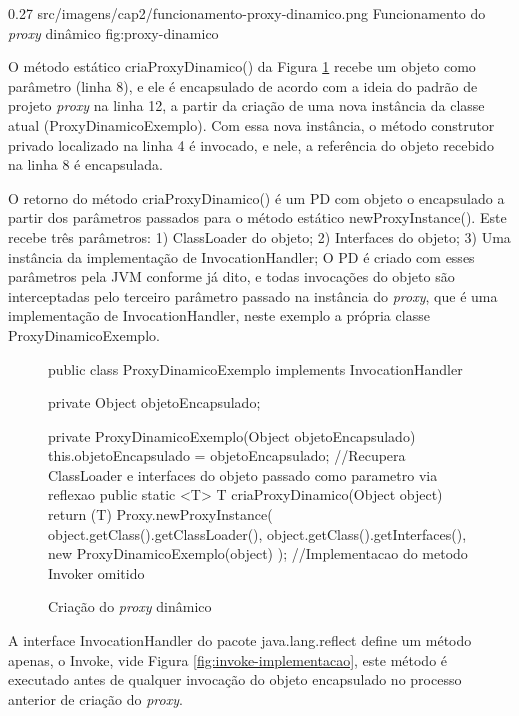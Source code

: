 \begin{image}
{0.27} %
{src/imagens/cap2/funcionamento-proxy-dinamico.png} %
{Funcionamento do \textit{proxy} dinâmico} %
{fig:proxy-dinamico} %
{} %
\end{image}

\par O método estático criaProxyDinamico() da Figura \ref{fig:cria-proxy-dinamico} recebe um objeto como parâmetro (linha 8), e ele é encapsulado de acordo com a ideia do padrão de projeto \textit{proxy} na linha 12, a partir da criação de uma nova instância da classe atual (ProxyDinamicoExemplo). Com essa nova instância, o método construtor privado localizado na linha 4 é invocado, e nele, a referência do objeto recebido na linha 8 é encapsulada.

\par O retorno do método criaProxyDinamico() é um PD com objeto o encapsulado a partir dos parâmetros passados para o método estático newProxyInstance(). Este recebe três parâmetros: 1) ClassLoader do objeto; 2) Interfaces do objeto; 3) Uma instância da implementação de InvocationHandler; O PD é criado com esses parâmetros pela JVM conforme já dito, e todas invocações do objeto são interceptadas pelo terceiro parâmetro passado na instância do \textit{proxy}, que é uma implementação de InvocationHandler, neste exemplo a própria classe ProxyDinamicoExemplo.

\begin{figure}[H]
    \centering
    \caption{Criação do \textit{proxy} dinâmico}
    \label{fig:cria-proxy-dinamico}
    \begin{java}
public class ProxyDinamicoExemplo implements InvocationHandler {
    	private Object objetoEncapsulado;

	private ProxyDinamicoExemplo(Object objetoEncapsulado) {
		this.objetoEncapsulado = objetoEncapsulado;
	}
//Recupera ClassLoader e interfaces do objeto passado como parametro via reflexao
	public static <T> T criaProxyDinamico(Object object) {
		return (T) Proxy.newProxyInstance(
        		object.getClass().getClassLoader(),
        		object.getClass().getInterfaces(),
        		new ProxyDinamicoExemplo(object)
		);
	}
//Implementacao do metodo Invoker omitido
}
    \end{java}
\end{figure}


\par A interface InvocationHandler do pacote java.lang.reflect define um método apenas, o Invoke, vide Figura \ref{fig:invoke-implementacao}, este método é executado antes de qualquer invocação do objeto encapsulado no processo anterior de criação do \textit{proxy}.

